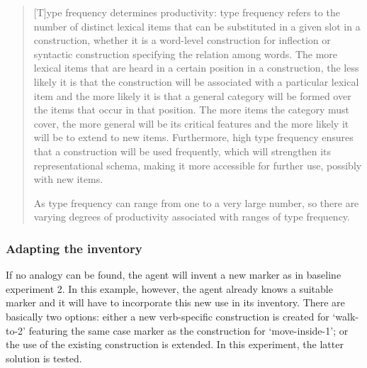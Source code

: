 \begin{quote}
[T]ype frequency determines productivity: type frequency refers to the number of distinct lexical items that can be substituted in a given slot in a construction, whether it is a word-level construction for inflection or syntactic construction specifying the relation among words. The more lexical items that are heard in a certain position in a construction, the less likely it is that the construction will be associated with a particular lexical item and the more likely it is that a general category will be formed over the items that occur in that position. The more items the category must cover, the more general will be its critical features and the more likely it will be to extend to new items. Furthermore, high type frequency ensures that a construction will be used frequently, which will strengthen its representational schema, making it more accessible for further use, possibly with new items.

As type frequency can range from one to a very large number, so there are varying degrees of productivity associated with ranges of type frequency. 
\end{quote}

\subsubsection{Adapting the inventory}
 If no analogy can be found, the agent will invent a new marker as in baseline experiment 2. In this example, however, the agent already knows a suitable marker and it will have to incorporate this new use in its inventory. There are basically two options: either a new verb-specific construction is created for `walk-to-2' featuring the same case marker as the construction for `move-inside-1'; or the use of the existing construction is extended. In this experiment, the latter solution is tested.

